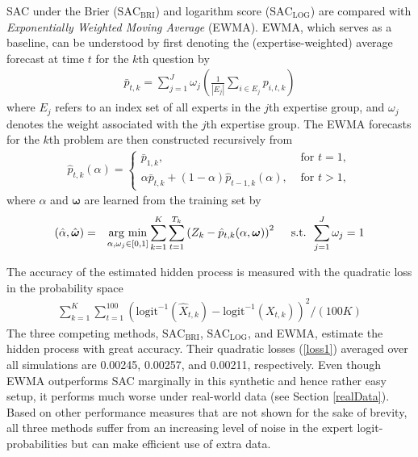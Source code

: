 \documentclass[aoas, preprint]{imsart}
\newcommand{\argmin}{\operatornamewithlimits{arg\ min}}
\numberwithin{equation}{section}
\theoremstyle{plain}
\newcommand{\logit}{\text{logit}}
\begin{document}
SAC under the Brier ($\text{SAC}_{\text{BRI}}$) and logarithm score ($\text{SAC}_{\text{LOG}}$) are compared with \textit{Exponentially Weighted Moving Average} (EWMA). EWMA, which serves as a baseline, can be understood by first denoting the (expertise-weighted) average forecast at time $t$ for the $k$th question by
\begin{eqnarray}
\bar{p}_{t,k}  = \sum_{j=1}^J \omega_j \left( \frac{1}{|E_j|}\sum_{i \in E_j} p_{i,t,k} \right) \label{weighted mean}
\end{eqnarray}
where $E_j$ refers to an index set of all experts in the $j$th expertise group, and $\omega_j$ denotes the weight associated with the $j$th expertise group. The EWMA forecasts for the $k$th problem are then constructed recursively from
\begin{eqnarray*}
\hat{p}_{t,k}(\alpha) =
\begin{cases}
 \bar{p}_{1,k}, & \text{ for } t  = 1, \\
\alpha \bar{p}_{t,k}  + (1-\alpha) \hat{p}_{t-1,k}(\alpha), & \text{ for } t > 1,
\end{cases}
\end{eqnarray*}
where $\alpha$ and $\boldsymbol{\omega}$ are learned from the training set by 
\begin{eqnarray}
(\hat{\alpha}, \hat{\boldsymbol{\omega}}) &=& \argmin_{\alpha, \omega_j \in [0,1]} \sum_{k =1}^K \sum_{t=1}^{T_k} \left(Z_k - \hat{p}_{t,k}(\alpha, \boldsymbol{\omega}) \right)^2 \label{EWMA}  \hspace{1em} \text{ s.t.} \hspace{0.5em} \sum_{j=1}^J \omega_j = 1 \nonumber
\end{eqnarray} 

The accuracy of the estimated hidden process is measured with the quadratic loss in the probability space
\begin{eqnarray}
\sum_{k=1}^K \sum_{t=1}^{100} ( \logit^{-1}(\hat{X}_{t,k}) - \logit^{-1}(X_{t,k}))^2 / (100K) \label{loss1}
\end{eqnarray}
The three competing methods, $\text{SAC}_{\text{BRI}}$, $\text{SAC}_{\text{LOG}}$, and EWMA, estimate the hidden process with great accuracy. Their quadratic losses (\ref{loss1}) averaged over all simulations are 0.00245, 0.00257, and 0.00211, respectively. Even though EWMA outperforms SAC marginally in this synthetic and hence rather easy setup, it performs much worse under real-world data (see Section \ref{realData}). Based on other performance measures that are not shown  for the sake of brevity, all three methods suffer from an increasing level of noise in the expert logit-probabilities but can make efficient use of extra data. 
\end{document}
